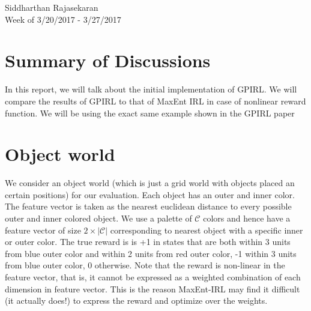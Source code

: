 \documentclass{article}[11pt]
\begin{document}
\begin{center}
Siddharthan Rajasekaran\\
Week of 3/20/2017 - 3/27/2017
\end{center}

\section{Summary of Discussions}
In this report, we will talk about the initial implementation of GPIRL. We will compare the results of GPIRL to that of MaxEnt IRL \cite{ziebart2010modeling} in case of nonlinear reward function. We will be using the exact same example shown in the GPIRL paper \cite{levine2011nonlinear}

\section{Object world}
We consider an object world (which is just a grid world with objects placed an certain positions) for our evaluation. Each object has an outer and inner color. The feature vector is taken as the nearest euclidean distance to every possible outer and inner colored object. We use a palette of $\mathcal{C}$ colors and hence have a feature vector of size $2 \times |\mathcal{C}|$ corresponding to nearest object with a specific inner or outer color. The true reward is is +1 in states that are both within 3 units from blue outer color and within 2 units from red outer color, -1 within 3 units from blue outer color, 0 otherwise. Note that the reward is non-linear in the feature vector, that is, it cannot be expressed as a weighted combination of each dimension in feature vector. This is the reason MaxEnt-IRL may find it difficult (it actually does!) to express the reward and optimize over the weights. 
\end{document}
